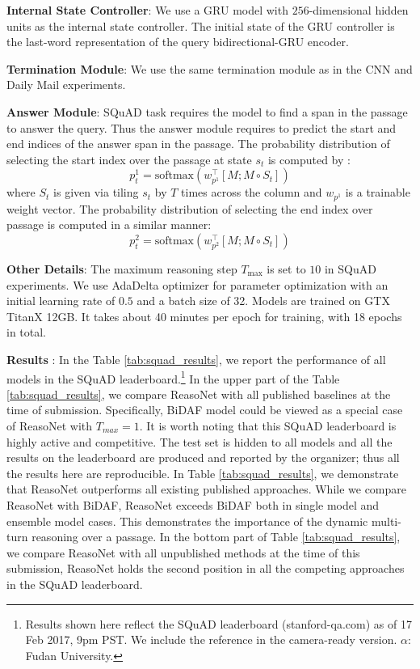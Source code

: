 \documentclass[sigconf]{acmart}
\begin{document}
\textbf{Internal State Controller}: We use a GRU model with $256$-dimensional hidden units as the internal state controller. The initial state of the GRU controller is the last-word representation of the query bidirectional-GRU encoder.

\textbf{Termination Module}: We use the same termination module as in the CNN and Daily Mail experiments.

\textbf{Answer Module}: SQuAD task requires the model to find a span in the passage to answer the query. Thus the answer module requires to predict the start and end indices of the answer span in the passage. The probability distribution of selecting the start index over the passage at state $s_t$ is computed by :
\[
p^{1}_{t} = \text{softmax}( w^{\intercal}_{p^{1}} [M; M \circ S_t] )
\]
where $S_t$ is given via tiling $s_t$ by $T$ times across the column and  $w_{p^{1}}$ is a trainable weight vector. The probability distribution of selecting the end index over passage is computed in a similar manner:
\[
p^{2}_{t} = \text{softmax}( w^{\intercal}_{p^{2}} [M; M \circ S_t] )
\]


\textbf{Other Details}: The maximum reasoning step $T_{\text{max}}$ is set to $10$ in SQuAD experiments. We use AdaDelta optimizer \citep{DBLP:journals/corr/abs-1212-5701} for parameter optimization with an initial learning rate of $0.5$ and a batch size of 32. Models are trained on GTX TitanX 12GB. It takes about 40 minutes per epoch for training, with 18 epochs in total.



\textbf{Results} :
In the Table \ref{tab:squad_results}, we report the performance of all models in the SQuAD leaderboard.\footnote{Results shown here reflect the SQuAD leaderboard (stanford-qa.com) as of 17 Feb 2017, 9pm PST. We include the reference in the camera-ready version. $\alpha:$ Fudan University.} In the upper part of the Table \ref{tab:squad_results}, we compare ReasoNet with all published baselines at the time of submission. Specifically, BiDAF model could be viewed as a special case of ReasoNet with $T_{max} = 1$. It is worth noting that this SQuAD leaderboard is highly active and competitive. The test set is hidden to all models and all the results on the leaderboard are produced and reported by the organizer; thus all the results here are reproducible. In Table \ref{tab:squad_results}, we demonstrate that ReasoNet outperforms all existing published approaches. While we compare ReasoNet with BiDAF, ReasoNet exceeds BiDAF both in single model and ensemble model cases.  This demonstrates the importance of the dynamic multi-turn reasoning over a passage. In the bottom part of Table \ref{tab:squad_results}, we compare ReasoNet with all unpublished methods at the time of this submission, ReasoNet holds the second position in all the competing approaches in the SQuAD leaderboard.
\end{document}
